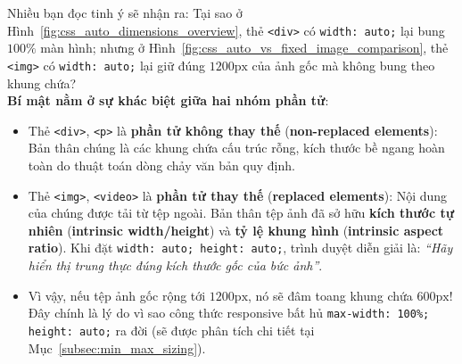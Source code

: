 \documentclass[11pt,oneside]{book}
\newcommand{\codeinline}[1]{\textcolor{accentOrange}{\texttt{#1}}}
\newcommand{\term}[1]{\textbf{\textcolor{primaryBlue}{#1}}}
\begin{document}
\begin{tipBox}
Nhiều bạn đọc tinh ý sẽ nhận ra: Tại sao ở Hình~\ref{fig:css_auto_dimensions_overview}, thẻ \codeinline{<div>} có \codeinline{width: auto;} lại bung $100\%$ màn hình; nhưng ở Hình~\ref{fig:css_auto_vs_fixed_image_comparison}, thẻ \codeinline{<img>} có \codeinline{width: auto;} lại giữ đúng $1200\text{px}$ của ảnh gốc mà không bung theo khung chứa?\\
\textbf{Bí mật nằm ở sự khác biệt giữa hai nhóm phần tử}:
\begin{itemize}[leftmargin=1.2em, itemsep=2.5pt, parsep=0pt]
    \item Thẻ \codeinline{<div>}, \codeinline{<p>} là \textbf{phần tử không thay thế} (\term{non-replaced elements}): Bản thân chúng là các khung chứa cấu trúc rỗng, kích thước bề ngang hoàn toàn do thuật toán dòng chảy văn bản quy định.
    \item Thẻ \codeinline{<img>}, \codeinline{<video>} là \textbf{phần tử thay thế} (\term{replaced elements}): Nội dung của chúng được tải từ tệp ngoài. Bản thân tệp ảnh đã sở hữu \textbf{kích thước tự nhiên} (\term{intrinsic width/height}) và \textbf{tỷ lệ khung hình} (\term{intrinsic aspect ratio}). Khi đặt \codeinline{width: auto; height: auto;}, trình duyệt diễn giải là: \textit{``Hãy hiển thị trung thực đúng kích thước gốc của bức ảnh''}.
    \item Vì vậy, nếu tệp ảnh gốc rộng tới $1200\text{px}$, nó sẽ đâm toang khung chứa $600\text{px}$! Đây chính là lý do vì sao công thức responsive bất hủ \codeinline{max-width: 100\%; height: auto;} ra đời (sẽ được phân tích chi tiết tại Mục~\ref{subsec:min_max_sizing}).
\end{itemize}
\end{tipBox}
\end{document}
